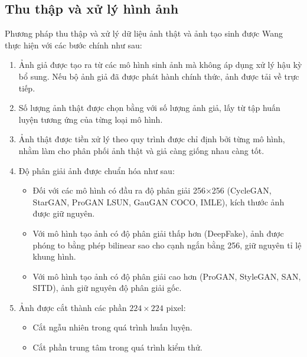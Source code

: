 \subsection{Thu thập và xử lý hình ảnh}
\label{ssec:thu_thap_va_xu_ly_hinh_anh}
%
Phương pháp thu thập và xử lý dữ liệu ảnh thật và ảnh tạo sinh được Wang~\cite{Wang2019CNNGeneratedIA} thực hiện với các bước chính như sau:
%
%
\begin{enumerate}
	\item Ảnh giả được tạo ra từ các mô hình sinh ảnh mà không áp dụng xử lý hậu kỳ bổ sung. Nếu bộ ảnh giả đã được phát hành chính thức, ảnh được tải về trực tiếp.
	
	\item Số lượng ảnh thật được chọn bằng với số lượng ảnh giả, lấy từ tập huấn luyện tương ứng của từng loại mô hình.
	
	\item Ảnh thật được tiền xử lý theo quy trình được chỉ định bởi từng mô hình, nhằm làm cho phân phối ảnh thật và giả càng giống nhau càng tốt.
	
	\item Độ phân giải ảnh được chuẩn hóa như sau:
	\begin{itemize}
		\item Đối với các mô hình có đầu ra độ phân giải 256×256 (CycleGAN, StarGAN, ProGAN LSUN, GauGAN COCO, IMLE), kích thước ảnh được giữ nguyên.
		\item Với mô hình tạo ảnh có độ phân giải thấp hơn (DeepFake), ảnh được phóng to bằng phép \gls{bilinear} sao cho cạnh ngắn bằng 256, giữ nguyên tỉ lệ khung hình.
		\item Với mô hình tạo ảnh có độ phân giải cao hơn (ProGAN, StyleGAN, SAN, SITD), ảnh giữ nguyên độ phân giải gốc.
	\end{itemize}
	
	\item Ảnh được cắt thành các phần $224 \times 224$ pixel:
	\begin{itemize}
		\item Cắt ngẫu nhiên trong quá trình huấn luyện.
		\item Cắt phần trung tâm trong quá trình kiểm thử.
	\end{itemize}
	
\end{enumerate}
%
%

